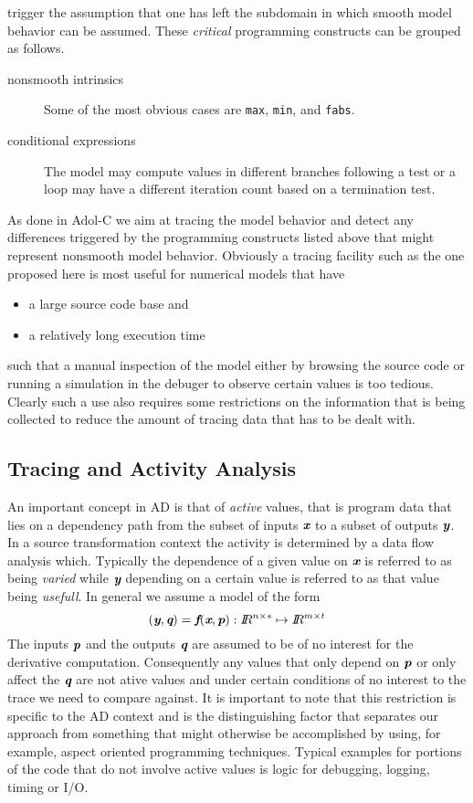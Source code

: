\documentclass{article}
\newcommand{\R}{I\!\!R}
\newcommand{\bmf}{\mbox{\bf\em f}}
\newcommand{\bmp}{\mbox{\bf\em p}}
\newcommand{\bmq}{\mbox{\bf\em q}}
\newcommand{\bmx}{\mbox{\bf\em x}}
\newcommand{\bmy}{\mbox{\bf\em y}}
\newcommand{\code}[1]{{\tt{#1}}}
\begin{document}
trigger the assumption that one has left the subdomain in which smooth model behavior 
can be assumed. 
These {\em critical} programming constructs can be grouped as follows.
\begin{description}
\item[nonsmooth intrinsics] Some of the most obvious cases are \code{max}, \code{min}, and \code{fabs}.
\item[conditional expressions] The model may compute values in different branches following a test 
or a loop may have a different iteration count based on a termination test.
\end{description}
As done in Adol-C we aim at tracing the model behavior and detect any differences triggered 
by the programming constructs listed above that might represent nonsmooth model behavior.
Obviously a tracing facility such as the one proposed here is most useful for 
numerical models that have 
\begin{itemize}
\item a large source code base and 
\item a relatively long execution time
\end{itemize}
such that a manual inspection of the model either by browsing the source code or 
running a simulation in the debuger to observe certain values is too tedious.
Clearly such a use also requires some restrictions on the information that is being 
collected to reduce the amount of tracing data that has to be dealt with.

\subsection{Tracing and Activity Analysis}
An important concept in AD is that of {\em active} values, that is 
program data that lies on a dependency path from the subset of inputs $\bmx$ to 
a subset of outputs $\bmy$. 
In a source transformation context the activity is determined by a data flow 
analysis which. Typically the dependence of a given value on $\bmx$ is 
referred to as being {\em varied} while $\bmy$ depending on 
a certain value is referred to as that value being {\em usefull}.   
In general we assume a model of the form 
\[
(\bmy,\bmq)=\bmf(\bmx,\bmp): \R^{n\times s}\mapsto \R^{m\times t}
\]
The inputs $\bmp$ and the outputs $\bmq$  are assumed to be of no interest 
for the derivative computation. Consequently any values that only depend on
$\bmp$ or only affect the $\bmq$ are not ative values and  
under certain conditions of no interest to the trace we need to compare against. 
It is important to note that this restriction is specific to the AD context 
and is the distinguishing factor that separates our  approach  
from something that might otherwise be accomplished 
by using, for example, aspect oriented programming techniques. 
Typical examples for portions of the code that do not involve active values 
is logic for debugging, logging, timing or I/O.   
\end{document}
